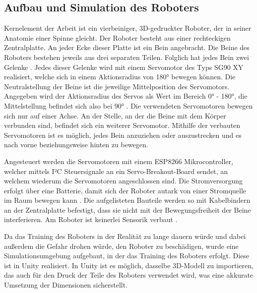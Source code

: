 \subsection{Aufbau und Simulation des Roboters}
Kernelement der Arbeit ist ein vierbeiniger, 3D-gedruckter Roboter, der in seiner Anatomie einer Spinne gleicht.
Der Roboter besteht aus einer rechteckigen Zentralplatte.
An jeder Ecke dieser Platte ist ein Bein angebracht.
Die Beine des Roboters bestehen jeweils aus drei separaten Teilen.
Folglich hat jedes Bein zwei Gelenke \cite[52]{waidner.2020}.
Jedes dieser Gelenke wird mit einem Servomotor des Typs SG90 XY realisiert, welche sich in einem Aktionsradius von 180° bewegen können.
Die Neutralstellung der Beine ist die jeweilige Mittelposition des Servomotors.
Angegeben wird der Aktionsradius des Servos als Wert im Bereich 0° - 180°, die Mittelstellung befindet sich also bei 90° \cite[38]{waidner.2020}.
Die verwendeten Servomotoren bewegen sich nur auf einer Achse.
An der Stelle, an der die Beine mit dem Körper verbunden sind, befindet sich ein weiterer Servomotor.
Mithilfe der verbauten Servomotoren ist es möglich, jedes Bein anzuziehen oder auszustrecken und es nach vorne beziehungsweise hinten zu bewegen.

Angesteuert werden die Servomotoren mit einem ESP8266 Mikrocontroller, welcher mittels I²C Steuersignale an ein Servo-Breakout-Board sendet, an welchem wiederum die Servomotoren angeschlossen sind.
Die Stromversorgung erfolgt über eine Batterie, damit sich der Roboter autark von einer Stromquelle im Raum bewegen kann \cite[54]{waidner.2020}.
Die aufgelisteten Bauteile werden so mit Kabelbindern an der Zentralplatte befestigt, dass sie nicht mit der Bewegungsfreiheit der Beine interferieren.
Am Roboter ist keinerlei Sensorik verbaut \cite[36]{waidner.2020}.

Da das Training des Roboters in der Realität zu lange dauern würde und dabei außerdem die Gefahr drohen würde, den Roboter zu beschädigen, wurde eine Simulationsumgebung aufgebaut, in der das Training des Roboters erfolgt.
Diese ist in Unity realisiert.
In Unity ist es möglich, dasselbe 3D-Modell zu importieren, das auch für den Druck der Teile des Roboters verwendet wird, was eine akkurate Umsetzung der Dimensionen sicherstellt.

